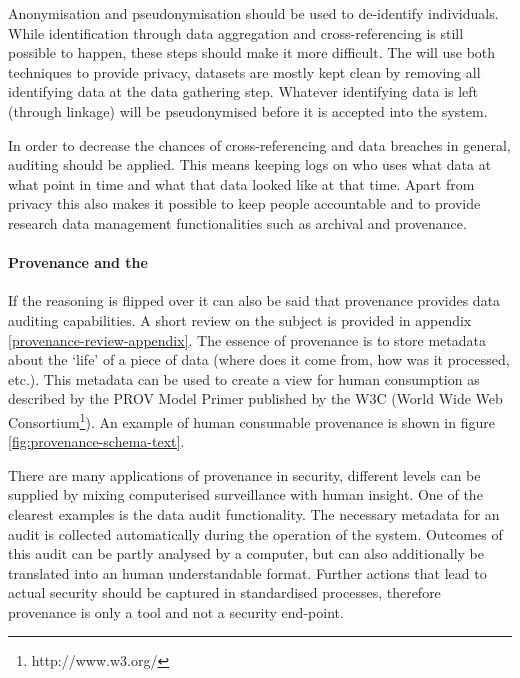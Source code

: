 Anonymisation and pseudonymisation should be used to de-identify individuals.
While identification through data aggregation and cross-referencing is still possible to happen, these steps should make it more difficult.
The \ivfsystem{} will use both techniques to provide privacy, datasets are mostly kept clean by removing all identifying data at the data gathering step.
Whatever identifying data is left (through linkage) will be pseudonymised before it is accepted into the system.

In order to decrease the chances of cross-referencing and data breaches in general, auditing should be applied.
This means keeping logs on who uses what data at what point in time and what that data looked like at that time.
Apart from privacy this also makes it possible to keep people accountable and to provide research data management functionalities such as archival and provenance.

\paragraph{Provenance and the \ivfsystem{}}
If the reasoning is flipped over it can also be said that provenance provides data auditing capabilities.
A short review on the subject is provided in appendix \ref{provenance-review-appendix}.
The essence of provenance is to store metadata about the `life' of a piece of data (where does it come from, how was it processed, etc.).
This metadata can be used to create a view for human consumption as described by the PROV Model Primer \cite{dsp8gil} published by the W3C (World Wide Web Consortium\footnote{http://www.w3.org/}).
An example of human consumable provenance is shown in figure \ref{fig:provenance-schema-text}.

There are many applications of provenance in security, different levels can be supplied by mixing computerised surveillance with human insight.
One of the clearest examples is the data audit functionality.
The necessary metadata for an audit is collected automatically during the operation of the system.
Outcomes of this audit can be partly analysed by a computer, but can also additionally be translated into an human understandable format.
Further actions that lead to actual security should be captured in standardised processes, therefore provenance is only a tool and not a security end-point.

